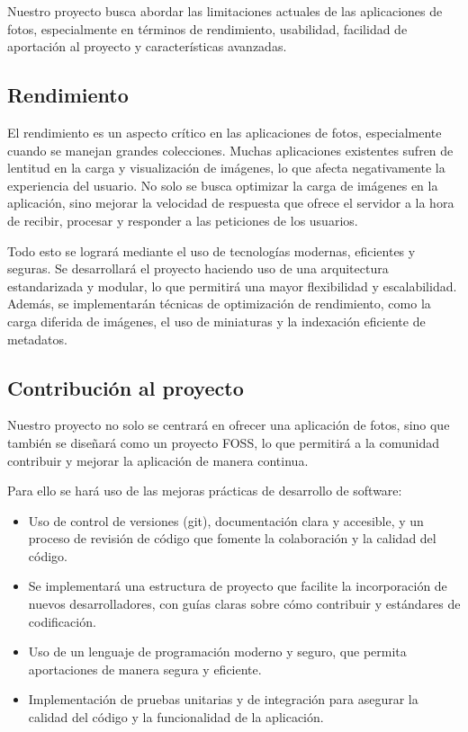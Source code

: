 Nuestro proyecto busca abordar las limitaciones actuales de las aplicaciones de fotos, especialmente en términos de rendimiento, usabilidad, facilidad de aportación al proyecto y características avanzadas.
\subsection{Rendimiento}
El rendimiento es un aspecto crítico en las aplicaciones de fotos, especialmente cuando se manejan grandes colecciones. Muchas aplicaciones existentes sufren de lentitud en la carga y visualización de imágenes, lo que afecta negativamente la experiencia del usuario.
No solo se busca optimizar la carga de imágenes en la aplicación, sino mejorar la velocidad de respuesta que ofrece el servidor a la hora de recibir, procesar y responder a las peticiones de los usuarios.

Todo esto se logrará mediante el uso de tecnologías modernas, eficientes y seguras.
Se desarrollará el proyecto haciendo uso de una arquitectura estandarizada y modular, lo que permitirá una mayor flexibilidad y escalabilidad. Además, se implementarán técnicas de optimización de rendimiento, como la carga diferida de imágenes, el uso de miniaturas y la indexación eficiente de metadatos.
\subsection{Contribución al proyecto}
Nuestro proyecto no solo se centrará en ofrecer una aplicación de fotos, sino que también se diseñará como un proyecto FOSS, lo que permitirá a la comunidad contribuir y mejorar la aplicación de manera continua.

Para ello se hará uso de las mejoras prácticas de desarrollo de software:
\begin{itemize}
    \item Uso de control de versiones (\Gls{git}), documentación clara y accesible, y un proceso de revisión de código que fomente la colaboración y la calidad del código.
    \item Se implementará una estructura de proyecto que facilite la incorporación de nuevos desarrolladores, con guías claras sobre cómo contribuir y estándares de codificación.
    \item Uso de un lenguaje de programación moderno y seguro, que permita aportaciones de manera segura y eficiente.
    \item Implementación de pruebas unitarias y de integración para asegurar la calidad del código y la funcionalidad de la aplicación.
\end{itemize}

